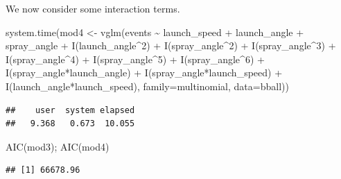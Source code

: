 \documentclass[
  ignorenonframetext,
]{beamer}
\newenvironment{Shaded}{\begin{snugshade}}{\end{snugshade}}
\newcommand{\AttributeTok}[1]{\textcolor[rgb]{0.77,0.63,0.00}{#1}}
\newcommand{\DecValTok}[1]{\textcolor[rgb]{0.00,0.00,0.81}{#1}}
\newcommand{\FunctionTok}[1]{\textcolor[rgb]{0.00,0.00,0.00}{#1}}
\newcommand{\NormalTok}[1]{#1}
\newcommand{\OtherTok}[1]{\textcolor[rgb]{0.56,0.35,0.01}{#1}}
\newcommand{\SpecialCharTok}[1]{\textcolor[rgb]{0.00,0.00,0.00}{#1}}
\begin{document}
\begin{frame}[fragile]{}
\protect\hypertarget{section-14}{}
We now consider some interaction terms.

\vspace{12pt}
\tiny

\begin{Shaded}
\begin{Highlighting}[]
\FunctionTok{system.time}\NormalTok{(mod4 }\OtherTok{\textless{}{-}} \FunctionTok{vglm}\NormalTok{(events }\SpecialCharTok{\textasciitilde{}}\NormalTok{ launch\_speed }\SpecialCharTok{+}\NormalTok{ launch\_angle }\SpecialCharTok{+}\NormalTok{ spray\_angle }\SpecialCharTok{+} 
               \FunctionTok{I}\NormalTok{(launch\_angle}\SpecialCharTok{\^{}}\DecValTok{2}\NormalTok{) }\SpecialCharTok{+} 
               \FunctionTok{I}\NormalTok{(spray\_angle}\SpecialCharTok{\^{}}\DecValTok{2}\NormalTok{) }\SpecialCharTok{+} \FunctionTok{I}\NormalTok{(spray\_angle}\SpecialCharTok{\^{}}\DecValTok{3}\NormalTok{) }\SpecialCharTok{+} \FunctionTok{I}\NormalTok{(spray\_angle}\SpecialCharTok{\^{}}\DecValTok{4}\NormalTok{) }\SpecialCharTok{+} 
               \FunctionTok{I}\NormalTok{(spray\_angle}\SpecialCharTok{\^{}}\DecValTok{5}\NormalTok{) }\SpecialCharTok{+} \FunctionTok{I}\NormalTok{(spray\_angle}\SpecialCharTok{\^{}}\DecValTok{6}\NormalTok{) }\SpecialCharTok{+} 
               \FunctionTok{I}\NormalTok{(spray\_angle}\SpecialCharTok{*}\NormalTok{launch\_angle) }\SpecialCharTok{+} \FunctionTok{I}\NormalTok{(spray\_angle}\SpecialCharTok{*}\NormalTok{launch\_speed) }\SpecialCharTok{+} 
               \FunctionTok{I}\NormalTok{(launch\_angle}\SpecialCharTok{*}\NormalTok{launch\_speed), }
             \AttributeTok{family=}\NormalTok{multinomial, }\AttributeTok{data=}\NormalTok{bball))}
\end{Highlighting}
\end{Shaded}

\begin{verbatim}
##    user  system elapsed 
##   9.368   0.673  10.055
\end{verbatim}

\begin{Shaded}
\begin{Highlighting}[]
\FunctionTok{AIC}\NormalTok{(mod3); }\FunctionTok{AIC}\NormalTok{(mod4)}
\end{Highlighting}
\end{Shaded}

\begin{verbatim}
## [1] 66678.96
\end{verbatim}


\end{frame}
\end{document}
